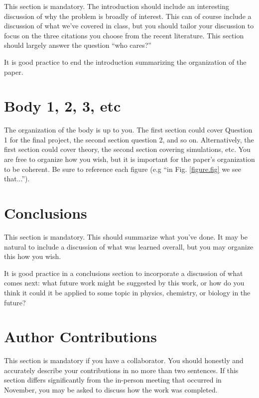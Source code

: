 \documentclass[12pt, oneside]{article}
\begin{document}
This section is mandatory.  The introduction should include an interesting discussion\cite{ref1,ref2} of why the problem is broadly of interest.  This can of course include a discussion of what we've covered in class, but you should tailor your discussion to focus on the three citations you choose from the recent literature.  This section should largely answer the question ``who cares?''  

It is good practice to end the introduction summarizing the organization of the paper. 

\section{Body 1, 2, 3, etc}
The organization of the body is up to you.  The first section could cover Question 1 for the final project, the second section question 2, and so on.  Alternatively, the first section could cover theory, the second section covering simulations, etc.  You are free to organize how you wish, but it is important for the paper's organization to be coherent.  Be sure to reference each figure (e.g ``in Fig. \ref{figure.fig} we see that...'').  


\section{Conclusions}

This section is mandatory.  This should summarize what you've done.  It may be natural to include a discussion of what was learned overall, but you may organize this how you wish.  

It is good practice in a conclusions section to incorporate a discussion of what comes next:  what future work might be suggested by this work, or how do you think it could it be applied to some topic in physics, chemistry, or biology in the future?  

\section{Author Contributions}

This section is mandatory if you have a collaborator.  You should honestly and accurately describe your contributions in no more than two sentences.  If this section differs significantly from the in-person meeting that occurred in November, you may be asked to discuss how the work was completed.  

 

\end{document}
